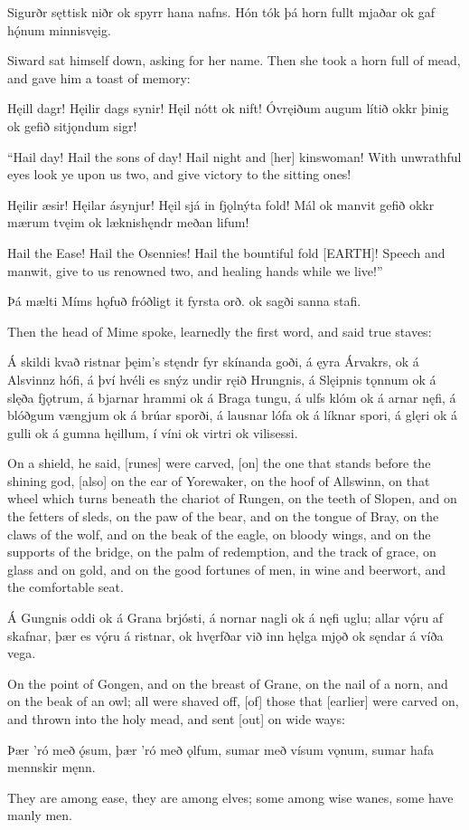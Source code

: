 Sigurðr sęttisk niðr ok spyrr hana nafns. Hón tók þá horn fullt mjaðar ok gaf hǫ́num minnisvęig. 

Siward sat himself down, asking for her name. Then she took a horn full of mead, and gave him a toast of memory:

Hęill dagr! \hld Hęilir dags synir!
\ind Hęil nótt ok nift!
Óvręiðum augum \hld lítið okkr þinig
\ind ok gefið sitjǫndum sigr! 

“Hail day! Hail the sons of day! Hail night and [her] kinswoman! With unwrathful eyes look ye upon us two, and give victory to the sitting ones!

Hęilir æsir! \hld Hęilar ásynjur!
\ind Hęil sjá in fjǫlnýta fold!
Mál ok manvit \hld gefið okkr mærum tvęim
\ind ok læknishęndr meðan lifum! 

Hail the Ease! Hail the Osennies! Hail the bountiful fold [EARTH]! Speech and manwit, give to us renowned two, and healing hands while we live!”

Þá mælti \hld Míms hǫfuð
\ind fróðligt it fyrsta orð.
\ind ok sagði sanna stafi. 

Then the head of Mime spoke, learnedly the first word, and said true staves:

Á skildi kvað ristnar \hld þęim’s stęndr fyr skínanda goði,
á ęyra Árvakrs, \hld ok á Alsvinnz hófi,
á því hvéli es snýz \hld undir ręið Hrungnis,
á Slęipnis tǫnnum \hld ok á slęða fjǫtrum,
á bjarnar hrammi \hld ok á Braga tungu,
á ulfs klóm \hld ok á arnar nęfi,
á blóðgum vængjum \hld ok á brúar sporði,
á lausnar lófa \hld ok á líknar spori,
á glęri ok á gulli \hld ok á gumna hęillum,
í víni ok virtri \hld ok vilisessi. 

On a shield, he said, [runes] were carved, [on] the one that stands before the shining god, [also] on the ear of Yorewaker, on the hoof of Allswinn, on that wheel which turns beneath the chariot of Rungen, on the teeth of Slopen, and on the fetters of sleds, on the paw of the bear, and on the tongue of Bray, on the claws of the wolf, and on the beak of the eagle, on bloody wings, and on the supports of the bridge, on the palm of redemption, and the track of grace, on glass and on gold, and on the good fortunes of men, in wine and beerwort, and the comfortable seat.

Á Gungnis oddi \hld ok á Grana brjósti,
á nornar nagli \hld ok á nęfi uglu;
allar vǫ́ru af skafnar, \hld þær es vǫ́ru á ristnar,
\ind ok hvęrfðar við inn hęlga mjǫð
\ind ok sęndar á víða vega. 

On the point of Gongen, and on the breast of Grane, on the nail of a norn, and on the beak of an owl; all were shaved off, [of] those that [earlier] were carved on, and thrown into the holy mead, and sent [out] on wide ways:

Þær ’ró með ǫ́sum, \hld þær ’ró með ǫlfum,
sumar með vísum vǫnum, \hld sumar hafa mennskir męnn. 

They are among ease, they are among elves; some among wise wanes, some have manly men.
